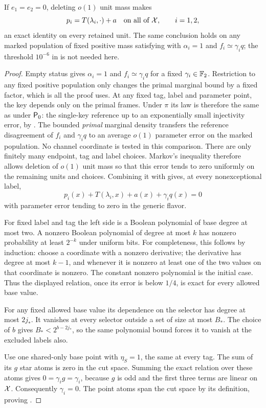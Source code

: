 \begin{lemma}
\label{lem:empty-status}
If \(e_1=e_2=0\), deleting \(o(1)\) unit mass makes
\begin{equation}
 p_i=T(\lambda_i,\cdot)+a
 \quad\text{on all of }\mathcal X,\qquad i=1,2,
 \label{eq:exact-prediction}
\end{equation}
an exact identity on every retained unit.
The same conclusion holds on any marked population of fixed
positive mass satisfying  with
\(\alpha_i=1\) and \(f_i\simeq\gamma_iq\); the threshold
\(10^{-6}\) in  is not needed here.
\end{lemma}

\begin{proof}
Empty status gives \(\alpha_i=1\) and
\(f_i\simeq\gamma_iq\) for a fixed \(\gamma_i\in\mathbb F_2\).
Restriction to any fixed positive population only changes the
primal marginal bound by a fixed factor, which is all the proof uses.
At any fixed tag, label and parameter point, the key depends
only on the primal frames.  Under \(\pi\) its law is therefore
the same as under \({\mathsf P_0}\): the single-key reference up to
an exponentially small injectivity error, by
.  The bounded \emph{primal} marginal
density transfers the reference disagreement of \(f_i\) and
\(\gamma_iq\) to an average \(o(1)\) parameter error on the
marked population.  No channel coordinate is tested in this
comparison.
There are only finitely many endpoint, tag and label choices.
Markov's inequality therefore allows deletion of \(o(1)\)
unit mass so that this error tends to zero uniformly on
the remaining units and choices.
Combining it with  gives, at every
nonexceptional label,
\[
 p_i(x)+T(\lambda_i,x)+a(x)+\gamma_iq(x)=0
\]
with parameter error tending to zero in the generic flavor.

For fixed label and tag the left side is a Boolean polynomial
of base degree at most two.  A nonzero Boolean polynomial of
degree at most \(k\) has nonzero probability at least \(2^{-k}\)
under uniform bits.  For completeness, this follows by induction:
choose a coordinate with a nonzero derivative; the derivative
has degree at most \(k-1\), and whenever it is nonzero at least
one of the two values on that coordinate is nonzero.
The constant nonzero polynomial is the initial case.
Thus the displayed relation, once its error is below \(1/4\),
is exact for every allowed base value.

For any fixed allowed base value its dependence on the selector
has degree at most \(2j_*\).  It vanishes at every selector
outside a set of size at most \(B_*\).
The choice of \(b\) gives
\(B_*<2^{b-2j_*}\), so the same polynomial bound forces it
to vanish at the excluded labels also.

Use one shared-only base point with \(\eta_S=1\), the same at
every tag.  The sum of its \(g\) star atoms is zero in the cut
space.  Summing the exact relation over these atoms gives
\(0=\gamma_i g=\gamma_i\), because \(g\) is odd and
the first three terms are linear on \(\mathcal X\).
Consequently \(\gamma_i=0\).
The point atoms span the cut space by its definition, proving
.
\end{proof}

